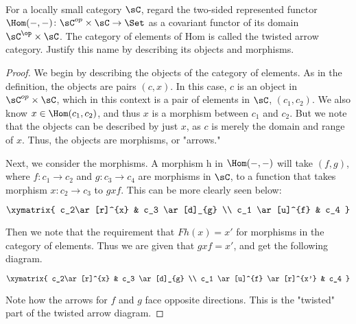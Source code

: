 \documentclass[main.tex]{subfiles}
\begin{document}
\paragraph{}

\begin{exercise}
For a locally small category $\sC$, regard the two-sided represented functor
$\Hom(-,-)\colon \sC^{op} \times \sC \rightarrow \Set$ as a covariant functor of its
domain $\sC^{\op} \times \sC$.  The category of elements of Hom is called the
twisted arrow category.  Justify this name by describing its objects and
morphisms.
\end{exercise}

\begin{proof}
We begin by describing the objects of the category of elements.  As in the
definition, the objects are pairs $(c,x)$.  In this case, $c$ is an object in
$\sC^{op} \times \sC$, which in this context is a pair of elements in $\sC$,
$(c_1,c_2)$.  We also know $x \in \Hom(c_1,c_2)$, and thus $x$ is a morphism
between $c_1$ and $c_2$.  But we note that the objects can be described by just
$x$, as $c$ is merely the domain and range of $x$.  Thus, the objects are
morphisms, or "arrows."

Next, we consider the morphisms.  A morphism h in $\Hom(-,-)$ will take
$(f,g)$, where $f\colon c_1 \rightarrow c_2$ and $g\colon c_3 \rightarrow c_4$ are
morphisms in $\sC$, to a function that takes morphism $x\colon c_2 \rightarrow c_3$
to $gxf$.  This can be more clearly seen below:

$\xymatrix{ c_2\ar[r]^{x} & c_3 \ar[d]_{g} \\ c_1 \ar[u]^{f}  & c_4 }\\$ 

Then we note that the requirement that $Fh(x) = x'$ for morphisms in the category of elements.  Thus we are given that $gxf = x'$, and get the following diagram.

$\xymatrix{ c_2\ar[r]^{x} & c_3 \ar[d]_{g} \\ c_1 \ar[u]^{f} \ar[r]^{x'}  & c_4 }\\$ 

Note how the arrows for $f$ and $g$ face opposite directions.  This is the "twisted" part of the twisted arrow diagram.
\end{proof}
\end{document}
